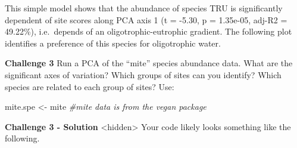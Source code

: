 \documentclass[
]{book}
\newenvironment{Shaded}{\begin{snugshade}}{\end{snugshade}}
\newcommand{\CommentTok}[1]{\textcolor[rgb]{0.56,0.35,0.01}{\textit{#1}}}
\newcommand{\NormalTok}[1]{#1}
\newcommand{\OtherTok}[1]{\textcolor[rgb]{0.56,0.35,0.01}{#1}}
\begin{document}
This simple model shows that the abundance of species TRU is
significantly dependent of site scores along PCA axis 1 (t = -5.30, p =
1.35e-05, adj-R2 = 49.22\%), i.e.~depends of an oligotrophic-eutrophic
gradient. The following plot identifies a preference of this species for
oligotrophic water.

\textbf{Challenge 3} Run a PCA of the ``mite'' species abundance data. What are
the significant axes of variation? Which groups of sites can you
identify? Which species are related to each group of sites? Use:

\begin{Shaded}
\begin{Highlighting}[]
\NormalTok{mite.spe }\OtherTok{\textless{}{-}}\NormalTok{ mite }\CommentTok{\#mite data is from the vegan package}
\end{Highlighting}
\end{Shaded}

\textbf{Challenge 3 - Solution} \textless hidden\textgreater{} Your code likely looks something
like the following.
\end{document}
